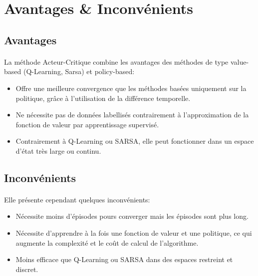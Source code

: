 \section{Avantages \& Inconvénients}

\subsection{Avantages}

\paragraph{}
\begin{samepage}
La méthode Acteur-Critique combine les avantages des méthodes de type value-based (Q-Learning, Sarsa) et policy-based:
\end{samepage}
\begin{itemize}
  \item Offre une meilleure convergence que les méthodes basées uniquement sur la politique, grâce à l'utilisation de la différence temporelle.
  \item Ne nécessite pas de données labellisés contrairement à l'approximation de la fonction de valeur par apprentissage supervisé.
  \item Contrairement à Q-Learning ou SARSA, elle peut fonctionner dans un espace d’état très large ou continu.
\end{itemize}
\subsection{Inconvénients}
\paragraph{}
Elle présente cependant quelques inconvénients:
\begin{itemize}
  \item Nécessite moins d’épisodes pours converger mais les épisodes sont plus long.
  \item Nécessite d'apprendre à la fois une fonction de valeur et une politique, ce qui augmente la complexité et le coût de calcul de l'algorithme.
  \item Moins efficace que Q-Learning ou SARSA dans des espaces restreint et discret.
\end{itemize}

